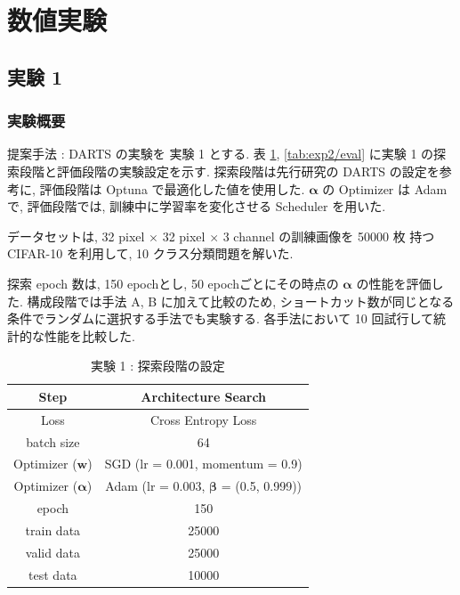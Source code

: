 \newpage
\changeindent{0cm}
\section{数値実験}
\label{sec:exp}
\changeindent{2cm}


\changeindent{0cm}
\subsection{実験 1}
\label{sec:exp.01}
\changeindent{2cm}


\changeindent{0cm}
\subsubsection{実験概要}
\label{sec:exp.01_01}
\changeindent{2cm}

提案手法 : DARTS の実験を 実験 1 とする.
表 \ref{tab:setting_exp}, \ref{tab:exp2/eval} に実験 1 の探索段階と評価段階の実験設定を示す.
探索段階は先行研究の DARTS の設定を参考に, 評価段階は Optuna で最適化した値を使用した.
$\bm{\alpha}$ の Optimizer は Adam\cite{Kingma2015AdamAM} で,
評価段階では, 訓練中に学習率を変化させる Scheduler\cite{Loshchilov2017SGDRSG} を用いた.

データセットは, 32 pixel $\times$ 32 pixel $\times$ 3 channel の訓練画像を 50000 枚 持つ CIFAR-10\cite{cifar10} を利用して,
10 クラス分類問題を解いた.

探索 epoch 数は, 150 epochとし, 50 epochごとにその時点の $\bm{\alpha}$ の性能を評価した.
構成段階では手法 A, B に加えて比較のため,
ショートカット数が同じとなる条件でランダムに選択する手法でも実験する.
各手法において 10 回試行して統計的な性能を比較した.

\clearpage
\begin{table}[tb]
  \begin{center}
    \caption{実験 1 : 探索段階の設定}
  	\vspace{3mm}
    \begin{tabular}{|c|c|} \hline
      Step & Architecture Search \\ \hline\hline
      Loss & Cross Entropy Loss \\ \hline
      batch size & 64 \\ \hline
      Optimizer ($\bm{w}$) & SGD (lr = 0.001, momentum = 0.9) \\ \hline
      Optimizer ($\bm{\alpha}$) & Adam (lr = 0.003, $\bm{\beta}$ = (0.5, 0.999)) \\ \hline
      epoch & 150\\ \hline
      train data & 25000\\ \hline
      valid data & 25000\\ \hline
      test data &  10000\\ \hline
    \end{tabular}
    \label{tab:setting_exp}
  \end{center}
\end{table}


